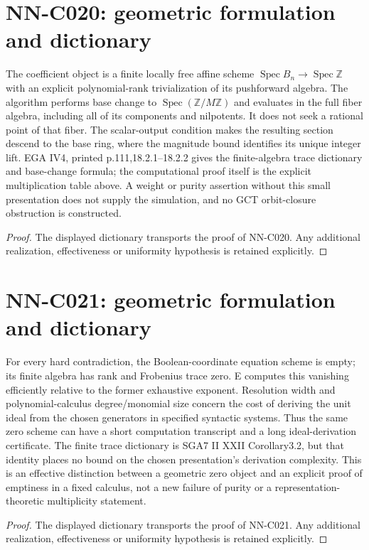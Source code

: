 \section{NN-C020: geometric formulation and dictionary}
\begin{geometricstatement}[NN-C020]
The coefficient object is a finite locally free affine scheme $\operatorname{Spec}B_n\to\operatorname{Spec}\mathbb Z$ with an explicit polynomial-rank trivialization of its pushforward algebra. The algorithm performs base change to $\operatorname{Spec}(\mathbb Z/M\mathbb Z)$ and evaluates in the full fiber algebra, including all of its components and nilpotents. It does not seek a rational point of that fiber. The scalar-output condition makes the resulting section descend to the base ring, where the magnitude bound identifies its unique integer lift. EGA IV4, printed p.111,18.2.1--18.2.2 gives the finite-algebra trace dictionary and base-change formula; the computational proof itself is the explicit multiplication table above. A weight or purity assertion without this small presentation does not supply the simulation, and no GCT orbit-closure obstruction is constructed.
\end{geometricstatement}
\begin{proof} The displayed dictionary transports the proof of NN-C020. Any additional realization, effectiveness or uniformity hypothesis is retained explicitly.\end{proof}


\section{NN-C021: geometric formulation and dictionary}
\begin{geometricstatement}[NN-C021]
For every hard contradiction, the Boolean-coordinate equation scheme is empty; its finite algebra has rank and Frobenius trace zero. E computes this vanishing efficiently relative to the former exhaustive exponent. Resolution width and polynomial-calculus degree/monomial size concern the cost of deriving the unit ideal from the chosen generators in specified syntactic systems. Thus the same zero scheme can have a short computation transcript and a long ideal-derivation certificate. The finite trace dictionary is SGA7 II XXII Corollary3.2, but that identity places no bound on the chosen presentation's derivation complexity. This is an effective distinction between a geometric zero object and an explicit proof of emptiness in a fixed calculus, not a new failure of purity or a representation-theoretic multiplicity statement.
\end{geometricstatement}
\begin{proof} The displayed dictionary transports the proof of NN-C021. Any additional realization, effectiveness or uniformity hypothesis is retained explicitly.\end{proof}


